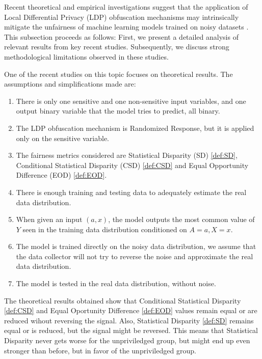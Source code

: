 \documentclass[conference]{IEEEtran}
\begin{document}
Recent theoretical and empirical investigations suggest that the application of Local Differential Privacy (LDP) obfuscation mechanisms may intrinsically mitigate the unfairness of machine learning models trained on noisy datasets \cite{makhlouf2024systematicformalstudyimpact}\cite{makhlouf2024impact}\cite{arcolezi2023local}. This subsection proceeds as follows: First, we present a detailed analysis of relevant results from key recent studies. Subsequently, we discuss strong methodological limitations observed in these studies.

One of the recent studies on this topic \cite{makhlouf2024systematicformalstudyimpact} focuses on theoretical results. The assumptions and simplifications made are:

\begin{enumerate}
\item There is only one sensitive and one non-sensitive input variables, and one output binary variable that the model tries to predict, all binary.
\item The LDP obfuscation mechanism is Randomized Response, but it is applied only on the sensitive variable.
\item The fairness metrics considered are Statistical Disparity (SD) \ref{def:SD}, Conditional Statistical Disparity (CSD) \ref{def:CSD} and Equal Opportunity Difference (EOD) \ref{def:EOD}.
\item There is enough training and testing data to adequately estimate the real data distribution.
\item When given an input $(a,x)$, the model outputs the most common value of $Y$ seen in the training data distribution conditioned on $A=a, X=x$.
\item The model is trained directly on the noisy data distribution, we assume that the data collector will not try to reverse the noise and approximate the real data distribution.
\item The model is tested in the real data distribution, without noise.
\end{enumerate}

The theoretical results obtained show that Conditional Statistical Disparity \ref{def:CSD} and Equal Oportunity Difference \ref{def:EOD} values remain equal or are reduced wihout reversing the signal. Also, Statistical Disparity \ref{def:SD} remains equal or is reduced, but the signal might be reversed. This means that Statistical Disparity never gets worse for the unpriviledged group, but might end up even stronger than before, but in favor of the unpriviledged group.
\end{document}

